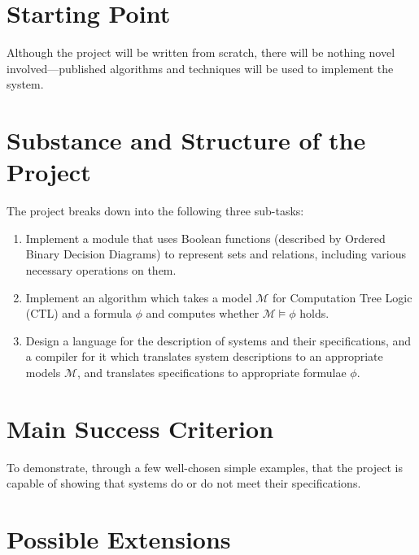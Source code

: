 \documentclass[12pt,a4paper,twoside]{article}
\newcommand{\M}{\mathcal{M}}
\begin{document}
\section*{Starting Point}

Although the project will be written from scratch, there will be nothing novel involved---published
algorithms and techniques will be used to implement the system.

\section*{Substance and Structure of the Project}

The project breaks down into the following three sub-tasks:

\begin{enumerate}
	\item Implement a module that uses Boolean functions (described
	by Ordered Binary Decision Diagrams) to represent sets and relations,
	including various necessary operations on them.
	
	\item Implement an algorithm which takes a model $\M$ for Computation
	Tree Logic (CTL) and a formula $\phi$
	and computes whether $\M \models \phi$ holds.
	
	\item Design a language for the description of systems and their
	specifications, and a compiler for
	it which translates system descriptions to an appropriate models $\M$, and
	translates specifications to appropriate formulae $\phi$.
\end{enumerate}

\section*{Main Success Criterion}

To demonstrate, through a few well-chosen simple examples, that the project
is capable of showing that systems do or do not meet their specifications.

\section*{Possible Extensions}
\end{document}
